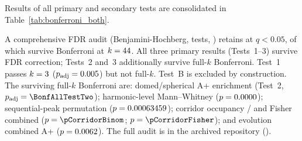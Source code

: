 \documentclass[HARVARD,twocolumn]{USG}
\begin{document}
Results of all primary and secondary tests are consolidated
in Table~\ref{tab:bonferroni_both}.

\begin{table}[tp]
\centering\small
\caption{Multiple-comparisons summary.
  Primary test family: Tests~1--3 ($k = \BonfK$, $\alpha = 0.05/\BonfK$).}
\label{tab:bonferroni_both}
\end{table}

A comprehensive FDR audit (Benjamini-Hochberg, \NtotalTests{} tests,
\citealt{benjamini1995controlling}) retains \NsurviveFDR{} at $q < 0.05$,
of which \NsurviveBonfAll{} survive Bonferroni at $k = 44$.
All three primary results (Tests~1--3) survive FDR correction; Tests~2
and~3 additionally survive full-$k$ Bonferroni. Test~1 passes $k = \BonfK$ ($p_\mathrm{adj} = 0.005$) but not full-$k$. Test~B is excluded by construction. The \NsurviveBonfAll{} surviving full-$k$ Bonferroni are:
domed/spherical A+ enrichment (Test~2, $p_\mathrm{adj} = \BonfAllTestTwo$);
harmonic-level Mann--Whitney ($p = 0.0000$);
sequential-peak permutation ($p = 0.00063459$);
corridor occupancy \corridorPrecHits{}/\corridorPrecN{} and Fisher combined
($p = \pCorridorBinom$; $p = \pCorridorFisher$);
and evolution combined A+ ($p = 0.0062$).
The full audit is in the archived repository (\citealt{tenenbaum2026audit}).
\end{document}
